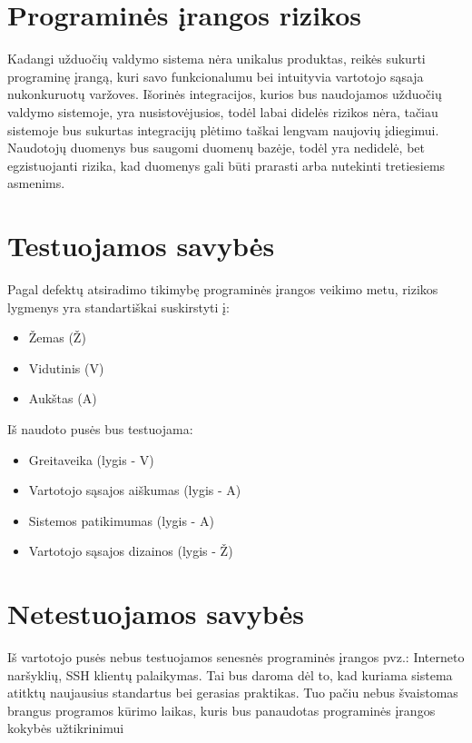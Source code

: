\section{Programinės įrangos rizikos}

Kadangi užduočių valdymo sistema nėra unikalus produktas, reikės sukurti programinę įrangą,
kuri savo funkcionalumu bei intuityvia vartotojo sąsaja nukonkuruotų varžoves.
Išorinės integracijos, kurios bus naudojamos užduočių valdymo sistemoje, yra nusistovėjusios, todėl labai didelės
rizikos nėra, tačiau sistemoje bus sukurtas integracijų plėtimo taškai lengvam naujovių įdiegimui.
Naudotojų duomenys bus saugomi duomenų bazėje, todėl yra nedidelė, bet egzistuojanti rizika, kad duomenys gali būti
prarasti arba nutekinti tretiesiems asmenims.


\section{Testuojamos savybės}

Pagal defektų atsiradimo tikimybę programinės įrangos veikimo metu, rizikos lygmenys yra standartiškai suskirstyti į:

\begin{itemize}
	\item Žemas (Ž)
	\item Vidutinis (V)
	\item Aukštas (A)
\end{itemize}

Iš naudoto pusės bus testuojama:

\begin{itemize}
	\item Greitaveika (lygis - V)
	\item Vartotojo sąsajos aiškumas (lygis - A)
	\item Sistemos patikimumas (lygis - A)
	\item Vartotojo sąsajos dizainos (lygis - Ž)
\end{itemize}


\section{Netestuojamos savybės}

Iš vartotojo pusės nebus testuojamos senesnės programinės įrangos pvz.: Interneto naršyklių, SSH klientų palaikymas.
Tai bus daroma dėl to, kad kuriama sistema atitktų naujausius standartus bei gerasias praktikas.
Tuo pačiu nebus švaistomas brangus programos kūrimo laikas, kuris bus panaudotas programinės įrangos kokybės užtikrinimui


